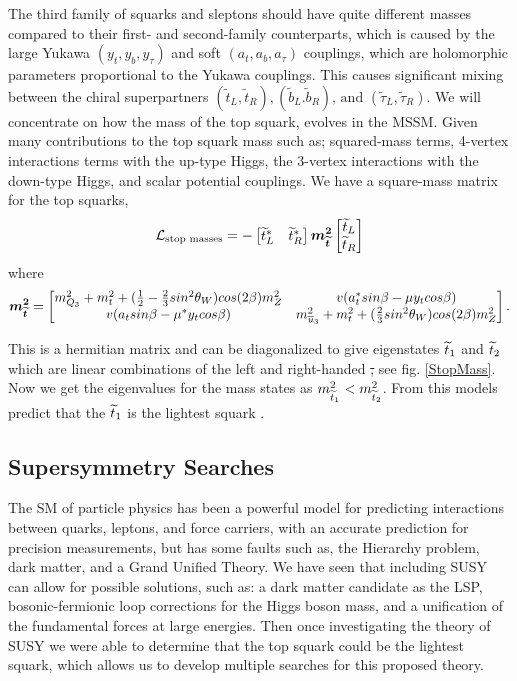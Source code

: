The third family of squarks and sleptons should have quite different masses compared to their first- and second-family counterparts, which is caused by the large Yukawa $(y_t, y_b, y_\tau)$ and soft $(a_t, a_b, a_\tau)$ couplings, which are holomorphic parameters proportional to the Yukawa couplings. This causes significant mixing between the chiral superpartners $(\widetilde{t}_L, \widetilde{t}_R), (\widetilde{b}_L. \widetilde{b}_R)\text{, and } (\widetilde{\tau}_L, \widetilde{\tau}_R)$. We will concentrate on how the mass of the top squark, \st{} evolves in the MSSM. Given many contributions to the top squark mass such as; squared-mass terms, 4-vertex interactions terms with the up-type Higgs, the 3-vertex interactions with the down-type Higgs, and scalar potential couplings. We have a square-mass matrix for the top squarks, 
\begin{equation}
\mathcal{L}_{\text{stop masses}}=-
\begin{bmatrix}
\widetilde{t}^*_L & \widetilde{t}^*_R \\
\end{bmatrix}
\boldsymbol{m_{\widetilde{t}}^2}
\begin{bmatrix}
\widetilde{t}_L \\
\widetilde{t}_R \\
\end{bmatrix}
\end{equation}
where 
\begin{equation}
\boldsymbol{m_{\widetilde{t}}^2}=
\begin{bmatrix}
m_{Q_3}^2+m_t^2+(\frac{1}{2}-\frac{2}{3}sin^2\theta_W)cos(2\beta)m_Z^2 & v(a_t^*sin\beta-\mu y_tcos\beta) \\
v(a_tsin\beta-\mu^*y_tcos\beta) & m^2_{\overline{u}_3} +m_t^2+(\frac{2}{3}sin^2\theta_W)cos(2\beta)m^2_Z \\ 
\end{bmatrix}.
\end{equation}

This is a hermitian matrix and can be diagonalized to give eigenstates $\widetilde{t}_1$ and $\widetilde{t}_2$ which are linear combinations of the left and right-handed \st, see fig. \ref{StopMass}. Now we get the eigenvalues for the mass states as $m_{\widetilde{t}_1}^2<m_{\widetilde{t}_2}^2$. From this models predict that the $\widetilde{t}_1$ is the lightest squark \cite{martin_supersymmetry_1997}. 

\subsection{Supersymmetry Searches}
The SM of particle physics has been a powerful model for predicting interactions between quarks, leptons, and force carriers, with an accurate prediction for precision measurements, but has some faults such as, the Hierarchy problem, dark matter, and a Grand Unified Theory. We have seen that including SUSY can allow for possible solutions, such as: a dark matter candidate as the LSP, bosonic-fermionic loop corrections for the Higgs boson mass, and a unification of the fundamental forces at large energies. Then once investigating the theory of SUSY we were able to determine that the top squark could be the lightest squark, which allows us to develop multiple searches for this proposed theory. 

